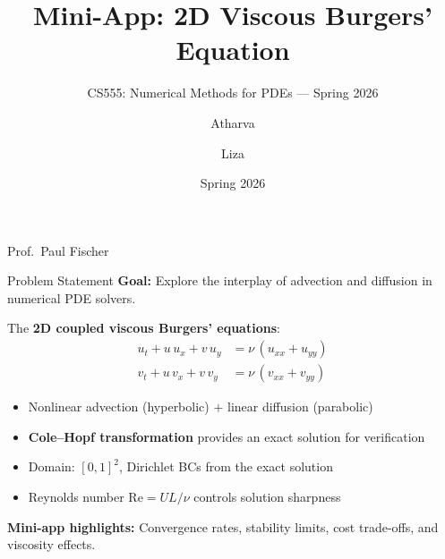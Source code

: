 \documentclass[aspectratio=169, 11pt]{beamer}
\title[2D Burgers' Mini-App]{Mini-App: 2D Viscous Burgers' Equation}
\subtitle{CS555: Numerical Methods for PDEs --- Spring 2026}
\author{Atharva \and Liza}
\institute{University of Illinois Urbana-Champaign}
\date{Spring 2026}
\newcommand{\profname}{Prof.\ Paul Fischer}
\begin{document}
\begin{frame}
  \titlepage
  \centering\profname
\end{frame}

\begin{frame}{Problem Statement}
  \textbf{Goal:} Explore the interplay of advection and diffusion in numerical PDE solvers.

  \medskip
  The \textbf{2D coupled viscous Burgers' equations}:
  \begin{align*}
    u_t + u\,u_x + v\,u_y &= \nu\,(u_{xx} + u_{yy}) \\
    v_t + u\,v_x + v\,v_y &= \nu\,(v_{xx} + v_{yy})
  \end{align*}

  \begin{itemize}
    \item Nonlinear advection (hyperbolic) $+$ linear diffusion (parabolic)
    \item \textbf{Cole--Hopf transformation} provides an exact solution for verification
    \item Domain: $[0,1]^2$, Dirichlet BCs from the exact solution
    \item Reynolds number $\mathrm{Re} = UL/\nu$ controls solution sharpness
  \end{itemize}

  \medskip
  \textbf{Mini-app highlights:}
  Convergence rates, stability limits, cost trade-offs, and viscosity effects.
\end{frame}
\end{document}
